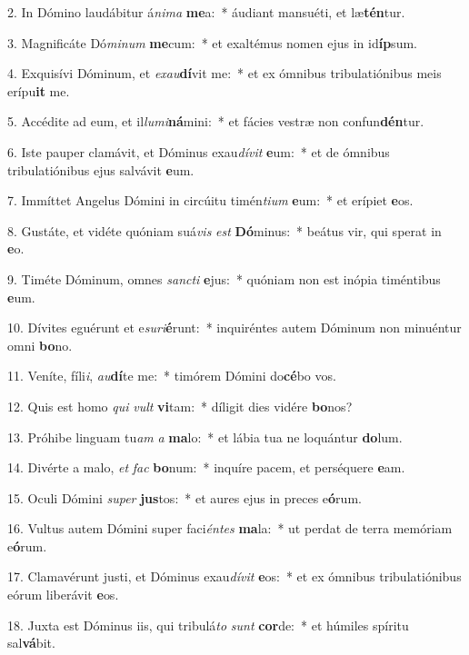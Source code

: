 2. In Dómino laudábitur á\textit{ni}\textit{ma} \textbf{me}a:~*  áudiant mansuéti, et læ\textbf{tén}tur.\

3. Magnificáte Dó\textit{mi}\textit{num} \textbf{me}cum:~*  et exaltémus nomen ejus in id\textbf{íp}sum.\

4. Exquisívi Dóminum, et \textit{ex}\textit{au}\textbf{dí}vit me:~*  et ex ómnibus tribulatiónibus meis erípu\textbf{it} me.\

5. Accédite ad eum, et il\textit{lu}\textit{mi}\textbf{ná}mini:~*  et fácies vestræ non confun\textbf{dén}tur.\

6. Iste pauper clamávit, et Dóminus exau\textit{dí}\textit{vit} \textbf{e}um:~*  et de ómnibus tribulatiónibus ejus salvávit \textbf{e}um.\

7. Immíttet Angelus Dómini in circúitu timén\textit{ti}\textit{um} \textbf{e}um:~*  et erípiet \textbf{e}os.\

8. Gustáte, et vidéte quóniam suá\textit{vis} \textit{est} \textbf{Dó}minus:~*  beátus vir, qui sperat in \textbf{e}o.\

9. Timéte Dóminum, omnes \textit{sanc}\textit{ti} \textbf{e}jus:~*  quóniam non est inópia timéntibus \textbf{e}um.\

10. Dívites eguérunt et e\textit{su}\textit{ri}\textbf{é}runt:~*  inquiréntes autem Dóminum non minuéntur omni \textbf{bo}no.\

11. Veníte, fíli\textit{i}, \textit{au}\textbf{dí}te me:~*  timórem Dómini do\textbf{cé}bo vos.\

12. Quis est homo \textit{qui} \textit{vult} \textbf{vi}tam:~*  díligit dies vidére \textbf{bo}nos?\

13. Próhibe linguam tu\textit{am} \textit{a} \textbf{ma}lo:~*  et lábia tua ne loquántur \textbf{do}lum.\

14. Divérte a malo, \textit{et} \textit{fac} \textbf{bo}num:~*  inquíre pacem, et perséquere \textbf{e}am.\

15. Oculi Dómini \textit{su}\textit{per} \textbf{jus}tos:~*  et aures ejus in preces e\textbf{ó}rum.\

16. Vultus autem Dómini super faci\textit{én}\textit{tes} \textbf{ma}la:~*  ut perdat de terra memóriam e\textbf{ó}rum.\

17. Clamavérunt justi, et Dóminus exau\textit{dí}\textit{vit} \textbf{e}os:~*  et ex ómnibus tribulatiónibus eórum liberávit \textbf{e}os.\

18. Juxta est Dóminus iis, qui tribulá\textit{to} \textit{sunt} \textbf{cor}de:~*  et húmiles spíritu sal\textbf{vá}bit.\

